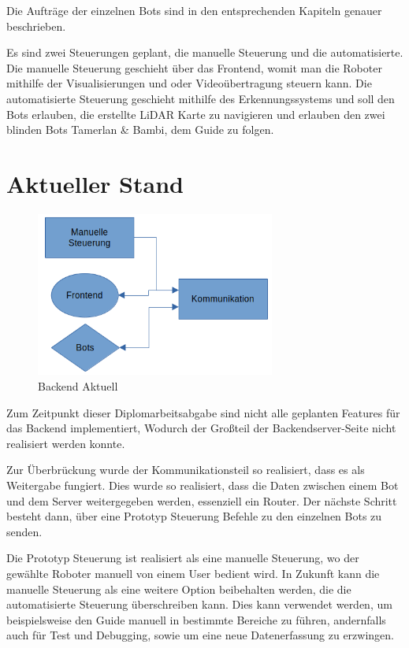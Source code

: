 Die Aufträge der einzelnen Bots 
sind in den entsprechenden Kapiteln genauer beschrieben.

Es sind zwei Steuerungen geplant, 
die manuelle Steuerung und die automatisierte.
% 
Die manuelle Steuerung geschieht über das Frontend, 
womit man die Roboter mithilfe der Visualisierungen 
und oder Videoübertragung steuern kann.
% 
Die automatisierte Steuerung geschieht mithilfe des Erkennungssystems 
und soll den Bots erlauben, die erstellte LiDAR Karte zu navigieren 
und erlauben den zwei blinden Bots Tamerlan \& Bambi, dem Guide zu folgen.

\section{Aktueller Stand}
\label{subsec:backend_aktueller_stand}

\begin{figure}[H]
    \includegraphics[width=0.7\textwidth, center]{img/Backend/backend-aktuell.png}
    \caption{Backend Aktuell}
    \label{fig:backend_konzept}
\end{figure}

Zum Zeitpunkt dieser Diplomarbeitsabgabe 
sind nicht alle geplanten Features für das Backend implementiert,
Wodurch der Großteil der Backendserver-Seite nicht realisiert werden konnte.

Zur Überbrückung wurde der Kommunikationsteil so realisiert, 
dass es als Weitergabe fungiert.
Dies wurde so realisiert, dass die Daten 
zwischen einem Bot und dem Server weitergegeben werden, essenziell ein Router. 
Der nächste Schritt besteht dann, über eine Prototyp Steuerung 
Befehle zu den einzelnen Bots zu senden.

Die Prototyp Steuerung ist realisiert als eine manuelle Steuerung, 
wo der gewählte Roboter manuell von einem User bedient wird.
In Zukunft kann die manuelle Steuerung als eine weitere Option beibehalten werden, 
die die automatisierte Steuerung überschreiben kann. 
Dies kann verwendet werden, 
um beispielsweise den Guide manuell in bestimmte Bereiche zu führen,
andernfalls auch für Test und Debugging, 
sowie um eine neue Datenerfassung zu erzwingen.

